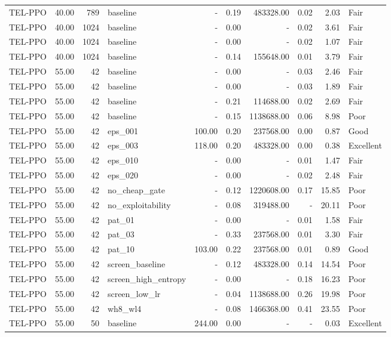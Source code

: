 \begin{table}[htbp]
\begin{tabular}{lrrlrrrrrl}
TEL-PPO & 40.00 & 789 & baseline & - & 0.19 & 483328.00 & 0.02 & 2.03 & Fair \\
TEL-PPO & 40.00 & 1024 & baseline & - & 0.00 & - & 0.02 & 3.61 & Fair \\
TEL-PPO & 40.00 & 1024 & baseline & - & 0.00 & - & 0.02 & 1.07 & Fair \\
TEL-PPO & 40.00 & 1024 & baseline & - & 0.14 & 155648.00 & 0.01 & 3.79 & Fair \\
TEL-PPO & 55.00 & 42 & baseline & - & 0.00 & - & 0.03 & 2.46 & Fair \\
TEL-PPO & 55.00 & 42 & baseline & - & 0.00 & - & 0.03 & 1.89 & Fair \\
TEL-PPO & 55.00 & 42 & baseline & - & 0.21 & 114688.00 & 0.02 & 2.69 & Fair \\
TEL-PPO & 55.00 & 42 & baseline & - & 0.15 & 1138688.00 & 0.06 & 8.98 & Poor \\
TEL-PPO & 55.00 & 42 & eps_001 & 100.00 & 0.20 & 237568.00 & 0.00 & 0.87 & Good \\
TEL-PPO & 55.00 & 42 & eps_003 & 118.00 & 0.20 & 483328.00 & 0.00 & 0.38 & Excellent \\
TEL-PPO & 55.00 & 42 & eps_010 & - & 0.00 & - & 0.01 & 1.47 & Fair \\
TEL-PPO & 55.00 & 42 & eps_020 & - & 0.00 & - & 0.02 & 2.48 & Fair \\
TEL-PPO & 55.00 & 42 & no_cheap_gate & - & 0.12 & 1220608.00 & 0.17 & 15.85 & Poor \\
TEL-PPO & 55.00 & 42 & no_exploitability & - & 0.08 & 319488.00 & - & 20.11 & Poor \\
TEL-PPO & 55.00 & 42 & pat_01 & - & 0.00 & - & 0.01 & 1.58 & Fair \\
TEL-PPO & 55.00 & 42 & pat_03 & - & 0.33 & 237568.00 & 0.01 & 3.30 & Fair \\
TEL-PPO & 55.00 & 42 & pat_10 & 103.00 & 0.22 & 237568.00 & 0.01 & 0.89 & Good \\
TEL-PPO & 55.00 & 42 & screen_baseline & - & 0.12 & 483328.00 & 0.14 & 14.54 & Poor \\
TEL-PPO & 55.00 & 42 & screen_high_entropy & - & 0.00 & - & 0.18 & 16.23 & Poor \\
TEL-PPO & 55.00 & 42 & screen_low_lr & - & 0.04 & 1138688.00 & 0.26 & 19.98 & Poor \\
TEL-PPO & 55.00 & 42 & wh8_wl4 & - & 0.08 & 1466368.00 & 0.41 & 23.55 & Poor \\
TEL-PPO & 55.00 & 50 & baseline & 244.00 & 0.00 & - & - & 0.03 & Excellent \\

\end{tabular}
\end{table}
